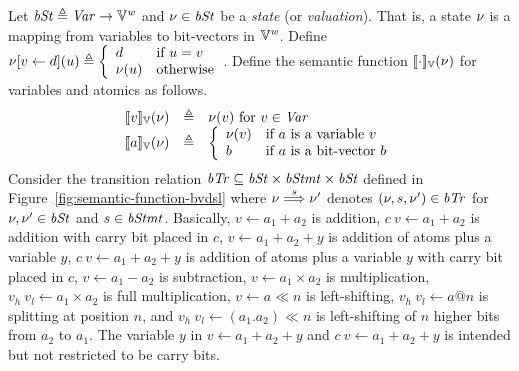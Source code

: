 Let $\mathit{bSt} \triangleq \mathit{Var} \rightarrow \mathbb{V}^{\mathit{w}}$ and $\nu \in \mathit{bSt}$ be a \emph{state} (or \emph{valuation}).
That is, a {state} $\nu$ is a mapping from variables to bit-vectors in $\mathbb{V}^{\mathit{w}}$.
Define
$
\nu{[}{v} \leftarrow {d}{]}(u) \triangleq
\left\{
   \begin{array}{ll}
     d & \textmd{if $u = v$}\\
     \nu(u) & \textmd{otherwise}
   \end{array}
\right.
$.
Define the semantic function $[\![{\cdot}]\!]_{\mathbb{V}}(\nu)$ for variables and atomics as follows.
\[
\begin{array}{rcl}
\bvvalueof{v}(\bvst) & \defn & \bvst(v) \textmd{  for ${v} \in \Var$} \\
\bvvalueof{a}(\bvst) & \defn & \left\{
  \begin{array}{ll}
  \bvst(v) & \textmd{if $a$ is a variable $v$} \\
  b & \textmd{if $a$ is a bit-vector $b$} \\
  \end{array}
  \right. \\
\end{array}
\]
Consider the transition relation $\mathit{bTr} \subseteq \mathit{bSt} \times \mathit{bStmt} \times \mathit{bSt}$ defined in Figure~\ref{fig:semantic-function-bvdsl} where
$\nu \overset{s}{\Longrightarrow} \nu'$ denotes $(\nu, s, \nu') \in \mathit{bTr}$
for $\nu, \nu' \in \mathit{bSt}$ and $s \in \mathit{bStmt}$.
Basically, $v \leftarrow a_1 + a_2$ is addition, $c\ v \leftarrow a_1 + a_2$ is addition with carry bit placed in $c$, $v \leftarrow a_1 + a_2 + y$ is addition of atoms plus a variable $y$, $c\ v \leftarrow a_1 + a_2 + y$ is addition of atoms plus a variable $y$ with carry bit placed in $c$, $v \leftarrow a_1 - a_2$ is subtraction, $v \leftarrow a_1 \times a_2$ is multiplication, $v_h\ v_l \leftarrow a_1 \times a_2$ is full multiplication, $v \leftarrow a \ll n$ is left-shifting, $v_h\ v_l \leftarrow a @ n$ is splitting at position $n$, and $v_h\ v_l \leftarrow (a_1 . a_2) \ll n$ is left-shifting of $n$ higher bits from $a_2$ to $a_1$.
The variable $y$ in $v \leftarrow a_1 + a_2 + y$ and $c\ v \leftarrow a_1 + a_2 + y$ is intended but not restricted to be carry bits.

